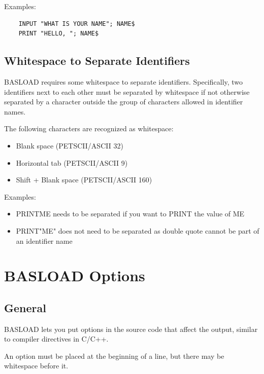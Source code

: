 \documentclass{article}
\begin{document}
        Examples:

        \begin{verbatim}
    INPUT "WHAT IS YOUR NAME"; NAME$
    PRINT "HELLO, "; NAME$
        \end{verbatim}

    \subsection{Whitespace to Separate Identifiers}

        BASLOAD requires some whitespace to separate identifiers. 
        Specifically, two identifiers next to each other must
        be separated by whitespace if not otherwise separated by
        a character outside the group of characters allowed in
        identifier names.

        The following characters are recognized as whitespace:

        \begin{itemize}
            \item Blank space (PETSCII/ASCII 32)
            \item Horizontal tab (PETSCII/ASCII 9)
            \item Shift + Blank space (PETSCII/ASCII 160)
        \end{itemize}

        Examples:

        \begin{itemize}
            \item PRINTME needs to be separated if you want to PRINT the value of ME
            \item PRINT"ME" does not need to be separated as double quote cannot be part of an identifier name
        \end{itemize}

\section{BASLOAD Options}

    \subsection{General}

        BASLOAD lets you put options in the source code that affect the output, similar to
        compiler directives in C/C++.

        An option must be placed at the beginning of a line, but there may be
        whitespace before it.
\end{document}
